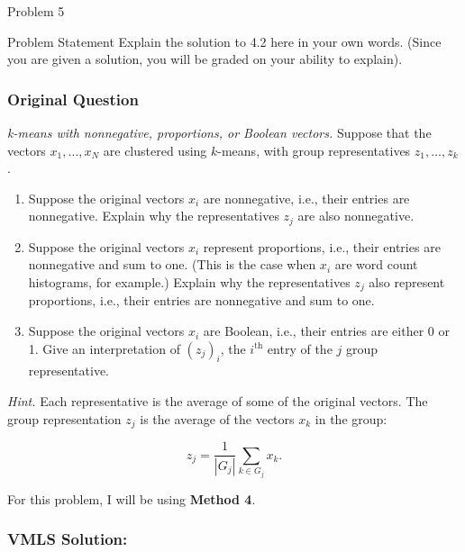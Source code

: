 \begin{problem}{Problem 5}
    \begin{statement}{Problem Statement}
        Explain the solution to 4.2 here in your own words. (Since you are given a solution, you will be graded on your ability to explain).

        \subsubsection*{Original Question}

        \textit{k-means with nonnegative, proportions, or Boolean vectors.} Suppose that the vectors $x_{1}, \dots, x_{N}$ are clustered using $k$-means, with group representatives $z_{1}, \dots, z_{k}$.

        \begin{enumerate}[label = (\alph*)]
            \item Suppose the original vectors $x_{i}$ are nonnegative, i.e., their entries are nonnegative. Explain why the representatives $z_{j}$ are also nonnegative.
            \item Suppose the original vectors $x_{i}$ represent proportions, i.e., their entries are nonnegative and sum to one. (This is the case when $x_{i}$ are word count histograms, for example.) 
            Explain why the representatives $z_{j}$ also represent proportions, i.e., their entries are nonnegative and sum to one.
            \item Suppose the original vectors $x_{i}$ are Boolean, i.e., their entries are either 0 or 1. Give an interpretation of $(z_{j})_{i}$, the $i^{\text{th}}$ entry of the $j$ group representative.
        \end{enumerate}
        \textit{Hint.} Each representative is the average of some of the original vectors. The group representation $z_{j}$ is the average of the vectors $x_{k}$ in the group:

        \begin{equation*}
            z_{j} = \frac{1}{|G_{j}|} \sum_{k \in G_{j}} x_{k}.
        \end{equation*}
    \end{statement}

    \begin{Highlight}
        \noindent For this problem, I will be using \textbf{Method 4}. 

        \subsubsection*{VMLS Solution:}


\end{Highlight}
\end{problem}

